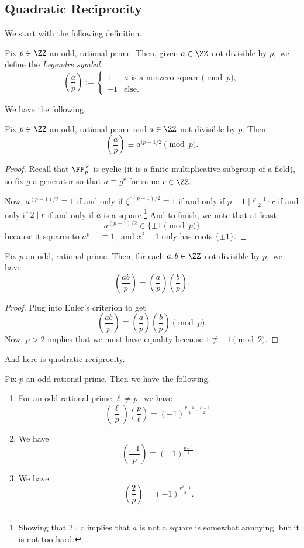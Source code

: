 \subsection{Quadratic Reciprocity}
We start with the following definition.
\begin{defi}
	Fix $p\in\ZZ$ an odd, rational prime. Then, given $a\in\ZZ$ not divisible by $p,$ we define the \textit{Legendre symbol}
	\[\left(\frac ap\right):=\begin{cases}
		1 & a\text{ is a nonzero square}\pmod p, \\
		-1 & \text{else}.
	\end{cases}\]
\end{defi}
We have the following.
\begin{prop}
	Fix $p\in\ZZ$ an odd, rational prime and $a\in\ZZ$ not divisible by $p.$ Then
	\[\left(\frac ap\right)\equiv a^{(p-1/2}\pmod p.\]
\end{prop}
\begin{proof}
	Recall that $\FF_p^\times$ is cyclic (it is a finite multiplicative subgroup of a field), so fix $g$ a generator so that $a\equiv g^r$ for some $r\in\ZZ.$

	Now, $a^{(p-1)/2}\equiv1$ if and only if $\zeta^{r(p-1)/2}\equiv1$ if and only if $p-1\mid\frac{p-1}2\cdot r$ if and only if $2\mid r$ if and only if $a$ is a square.\footnote{Showing that $2\nmid r$ implies that $a$ is not a square is somewhat annoying, but it is not too hard.} And to finish, we note that at least
	\[a^{(p-1)/2}\in\{\pm1\pmod p\}\]
	because it squares to $a^{p-1}\equiv1,$ and $x^2-1$ only has roots $\{\pm1\}.$
\end{proof}
\begin{corollary}
	Fix $p$ an odd, rational prime. Then, for each $a,b\in\ZZ$ not divisible by $p,$ we have
	\[\left(\frac{ab}p\right)=\left(\frac ap\right)\left(\frac bp\right).\]
\end{corollary}
\begin{proof}
	Plug into Euler's criterion to get
	\[\left(\frac{ab}p\right)\equiv\left(\frac ap\right)\left(\frac bp\right)\pmod p.\]
	Now, $p>2$ implies that we must have equality because $1\not\equiv-1\pmod2.$
\end{proof}
And here is quadratic reciprocity.
\begin{theorem}
	Fix $p$ an odd rational prime. Then we have the following.
	\begin{enumerate}[label=(\alph*)]
		\item For an odd rational prime $\ell\ne p,$ we have
		\[\left(\frac\ell p\right)\left(\frac p\ell\right)=(-1)^{\frac{p-1}2\cdot\frac{\ell-1}2}.\]
		\item We have
		\[\left(\frac{-1}p\right)\equiv(-1)^{\frac{p-1}2}.\]
		\item We have
		\[\left(\frac 2p\right)=(-1)^{\frac{p^2-1}8}.\]
	\end{enumerate}
\end{theorem}
